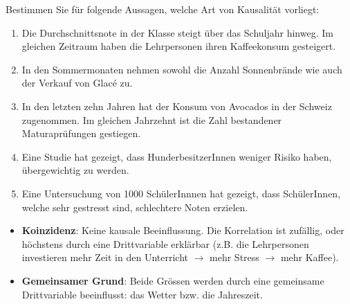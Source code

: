 \begin{myexercise}
    Bestimmen Sie für folgende Aussagen, welche Art von Kausalität vorliegt:

    \begin{enumerate}
        \item Die Durchschnittsnote in der Klasse steigt über das Schuljahr hinweg. Im gleichen Zeitraum haben die Lehrpersonen ihren Kaffeekonsum gesteigert.
        \item In den Sommermonaten nehmen sowohl die Anzahl Sonnenbrände wie auch der Verkauf von Glacé zu.
        \item In den letzten zehn Jahren hat der Konsum von Avocados in der Schweiz zugenommen. Im gleichen Jahrzehnt ist die Zahl bestandener Maturaprüfungen gestiegen.
        \item Eine Studie hat gezeigt, dass HunderbesitzerInnen weniger Risiko haben, übergewichtig zu werden.
        \item Eine Untersuchung von 1000 SchülerInnnen hat gezeigt, dass SchülerInnen, welche sehr gestresst sind, schlechtere Noten erzielen.
    \end{enumerate}

    \begin{myanswer}
        \begin{itemize}
            \item \textbf{Koinzidenz}: Keine kausale Beeinflussung. Die Korrelation ist zufällig, oder höchstens durch eine Drittvariable erklärbar (z.B. die Lehrpersonen investieren mehr Zeit in den Unterricht $\rightarrow$ mehr Stress $\rightarrow$ mehr Kaffee).
                  \begin{center}
                  \end{center}

            \item \textbf{Gemeinsamer Grund}: Beide Grössen werden durch eine gemeinsame Drittvariable beeinflusst: das Wetter bzw. die Jahreszeit.
                  \begin{center}
                  \end{center}


\end{itemize}
\end{myanswer}
\end{myexercise}
